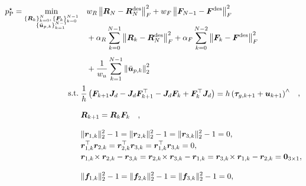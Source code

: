 \begin{subequations}
\label{eq:controlled_3d_pendulum_pop}
\begin{align}
p_{\mathrm{P}}^{\star}
=
\min_{\substack{
\{\bm{R}_k\}_{k=0}^{N},\,\{\bm{F}_k\}_{k=0}^{N-1}\\[-0.2em]
\{\bar{\bm{u}}_{p,k}\}_{k=1}^{N-1}}}
\quad
&w_R\left\|\bm{R}_N-\bm{R}_N^{\mathrm{des}}\right\|_F^2
+w_F\left\|\bm{F}_{N-1}-\bm{F}^{\mathrm{des}}\right\|_F^2
\notag\\[-0.9em]
&+\alpha_R \sum_{k=0}^{N-1}
\left\|\bm{R}_k-\bm{R}_N^{\mathrm{des}}\right\|_F^2
+\alpha_F \sum_{k=0}^{N-2}
\left\|\bm{F}_k-\bm{F}^{\mathrm{des}}\right\|_F^2
\notag\\[0.4em]
&+\frac{1}{w_u} \sum_{k=1}^{N-1}\left\|\bar{\bm{u}}_{p,k}\right\|_2^2
\label{eq:controlled_3d_pendulum_pop_objective}
\\[0.2em]
\hspace{-0.9em}\text{s.t.}\quad
&\hspace{-0.9em}\begin{aligned}
\frac{1}{h}\left(
\bm{F}_{k+1}\bm{J}_d-\bm{J}_d\bm{F}_{k+1}^{\top}-\bm{J}_d\bm{F}_k+\bm{F}_k^{\top}\bm{J}_d
\right)
&=h\left(\bm{\tau}_{g,k+1}+\bm{u}_{k+1}\right)^{\wedge}
\end{aligned},
\label{eq:controlled_3d_pendulum_pop_dynamics}
\\[0.8em]
&\hspace{-0.9em}\begin{aligned}
\bm{R}_{k+1}&=\bm{R}_k\bm{F}_k
\end{aligned},
\label{eq:controlled_3d_pendulum_pop_kinematics}
\\[0.8em]
&\hspace{-0.9em}\begin{aligned}
&\|\bm{r}_{1,k}\|_2^2-1=\|\bm{r}_{2,k}\|_2^2-1=\|\bm{r}_{3,k}\|_2^2-1=0,\\[-0.2em]
&\bm{r}_{1,k}^{\top}\bm{r}_{2,k}=\bm{r}_{2,k}^{\top}\bm{r}_{3,k}
=\bm{r}_{1,k}^{\top}\bm{r}_{3,k}=0,\\[-0.2em]
&\bm{r}_{1,k}\!\times \bm{r}_{2,k}-\bm{r}_{3,k}
=\bm{r}_{2,k}\!\times \bm{r}_{3,k}-\bm{r}_{1,k}
=\bm{r}_{3,k}\!\times \bm{r}_{1,k}-\bm{r}_{2,k}=\bm{0}_{3\times1},
\end{aligned}
\label{eq:controlled_3d_pendulum_pop_so3_R}
\\[0.8em]
&\hspace{-0.9em}\begin{aligned}
&\|\bm{f}_{1,k}\|_2^2-1=\|\bm{f}_{2,k}\|_2^2-1=\|\bm{f}_{3,k}\|_2^2-1=0,\\[-0.2em]

\end{aligned}
\end{align}
\end{subequations}
